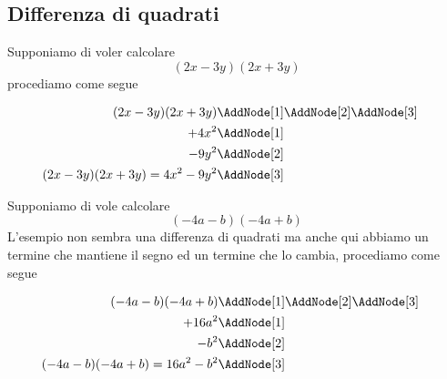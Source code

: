 \subsection{Differenza di quadrati}
\begin{esempio}
Supponiamo di voler calcolare \[(2x-3y)(2x+3y)\]
procediamo come segue
\begin{NodesList}
	\begin{align*}
		(2x-3y)(2x+3y)&\AddNode[1]\AddNode[2]\AddNode[3]\\
		+4x^2&\AddNode[1]&\\ 
		-9y^2&\AddNode[2]&\\
		(2x-3y)(2x+3y)=4x^2-9y^2&\AddNode[3]
	\end{align*}
\end{NodesList}
\end{esempio}
\begin{esempio}
Supponiamo di vole calcolare \[(-4a-b)(-4a+b)\]
L'esempio non sembra una differenza di quadrati ma anche qui abbiamo un termine che mantiene il segno ed un termine che lo cambia, procediamo come segue
\begin{NodesList}
	\begin{align*}
		(-4a-b)(-4a+b)&\AddNode[1]\AddNode[2]\AddNode[3]\\
		+16a^2&\AddNode[1]&\\ 
		-b^2&\AddNode[2]&\\
		(-4a-b)(-4a+b)=16a^2-b^2&\AddNode[3]
	\end{align*}
\end{NodesList}
\end{esempio}
